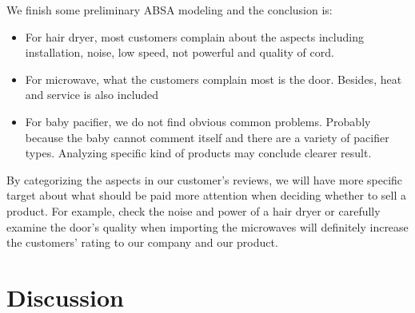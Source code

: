 \documentclass[12pt]{article}  %
\begin{document}
We finish some preliminary ABSA modeling and the conclusion is:
\begin{itemize}
\item For hair dryer, most customers complain about the aspects including installation, noise, low speed, not powerful and quality of cord.
\item For microwave, what the customers complain most is the door. Besides, heat and service is also included 
\item For baby pacifier, we do not find obvious common problems. Probably because the baby cannot comment itself and there are a variety of pacifier types. Analyzing specific kind of products may conclude clearer result. 
\end{itemize}
By categorizing the aspects in our customer's reviews, we will have more specific target about what should be paid more attention when deciding whether to sell a product. For example, check the noise and power of a hair dryer or carefully examine the door's quality when importing the microwaves will definitely increase the customers' rating to our company and our product. 

\section{Discussion}
\end{document}
